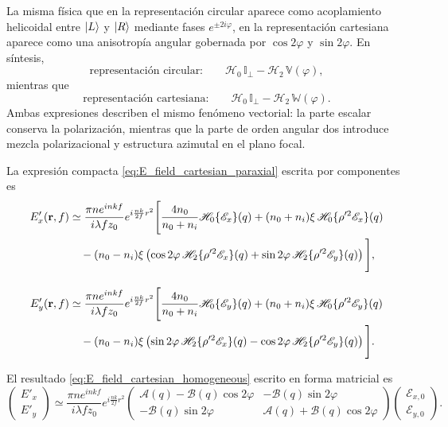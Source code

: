 La misma física que en la representación circular aparece como acoplamiento
helicoidal entre $\ket L$ y $\ket R$ mediante fases $e^{\pm2i\varphi}$, en la
representación cartesiana aparece como una anisotropía angular gobernada por
$\cos2\varphi$ y $\sin2\varphi$. En síntesis,
\begin{equation}
\text{representación circular:}
\qquad
\mathscr H_0\,\mathbb I_\perp
-
\mathscr H_2\,\mathbb V(\varphi),
\end{equation}
mientras que
\begin{equation}
\text{representación cartesiana:}
\qquad
\mathscr H_0\,\mathbb I_\perp
-
\mathscr H_2\,\mathbb W(\varphi).
\end{equation}
Ambas expresiones describen el mismo fenómeno vectorial: la parte escalar
conserva la polarización, mientras que la parte de orden angular dos introduce
mezcla polarizacional y estructura azimutal en el plano focal.

La expresión compacta \eqref{eq:E_field_cartesian_paraxial} escrita por componentes es
\begin{equation}
\begin{aligned}
E'_x(\vb r,f)
&\simeq
\frac{\pi n e^{inkf}}{i\lambda f z_0}
e^{i\frac{nk}{2f}r^2}
\Bigg[
\frac{4n_0}{n_0+n_i}
\mathscr H_0\{\mathscr E_x\}(q)
+
(n_0+n_i)\xi\,
\mathscr H_0\{\rho'^2\mathscr E_x\}(q)
\\
&\quad
-
(n_0-n_i)\xi
\left(
\cos2\varphi\,
\mathscr H_2\{\rho'^2\mathscr E_x\}(q)
+
\sin2\varphi\,
\mathscr H_2\{\rho'^2\mathscr E_y\}(q)
\right)
\Bigg],
\\[1em]
E'_y(\vb r,f)
&\simeq
\frac{\pi n e^{inkf}}{i\lambda f z_0}
e^{i\frac{nk}{2f}r^2}
\Bigg[
\frac{4n_0}{n_0+n_i}
\mathscr H_0\{\mathscr E_y\}(q)
+
(n_0+n_i)\xi\,
\mathscr H_0\{\rho'^2\mathscr E_y\}(q)
\\
&\quad
-
(n_0-n_i)\xi
\left(
\sin2\varphi\,
\mathscr H_2\{\rho'^2\mathscr E_x\}(q)
-
\cos2\varphi\,
\mathscr H_2\{\rho'^2\mathscr E_y\}(q)
\right)
\Bigg].
\end{aligned}
\label{eq:Ex_Ey_cartesian_paraxial}
\end{equation}

El resultado \eqref{eq:E_field_cartesian_homogeneous} escrito en forma matricial es
\begin{equation}
\begin{pmatrix}
E'_x\\
E'_y
\end{pmatrix}
\simeq
\frac{\pi n e^{inkf}}{i\lambda f z_0}
e^{i\frac{nk}{2f}r^2}
\begin{pmatrix}
\mathcal A(q)-\mathcal B(q)\cos2\varphi
&
-\mathcal B(q)\sin2\varphi
\\
-\mathcal B(q)\sin2\varphi
&
\mathcal A(q)+\mathcal B(q)\cos2\varphi
\end{pmatrix}
\begin{pmatrix}
\mathscr E_{x,0}\\
\mathscr E_{y,0}
\end{pmatrix}.
\label{eq:E_field_cartesian_homogeneous_matrix}
\end{equation}

